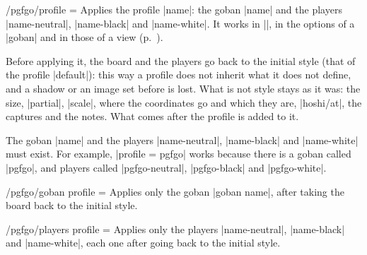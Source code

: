 \begin{goban}[9, stone = {radius = 4pt}, mark = {line = {color = red}}]
\begin{key}{/pgfgo/profile = }
	Applies the profile |name|: the goban |name| and the players |name-neutral|, |name-black| and |name-white|. It works in |\pgfgoset|, in the options of a |goban| and in those of a view (p.~\pageref{subsec:views}).

	Before applying it, the board and the players go back to the initial style (that of the profile |default|): this way a profile does not inherit what it does not define, and a shadow or an image set before is lost. What is not style stays as it was: the size, |partial|, |scale|, where the coordinates go and which they are, |hoshi/at|, the captures and the notes. What comes after the profile is added to it.

	\begin{codeexample}[width=3cm]
		\begin{goban}[3, profile = default]
		\end{goban}
	\end{codeexample}

	The goban |name| and the players |name-neutral|, |name-black| and |name-white| must exist. For example, |profile = pgfgo| works because there is a goban called |pgfgo|, and players called |pgfgo-neutral|, |pgfgo-black| and |pgfgo-white|.
\end{key}

\begin{key}{/pgfgo/goban profile = }
	Applies only the goban |goban name|, after taking the board back to the initial style.
\end{key}

\begin{key}{/pgfgo/players profile = }
	Applies only the players |name-neutral|, |name-black| and |name-white|, each one after going back to the initial style.

	\begin{codeexample}[]
		\begin{goban}[3, goban profile = pgfgo]
		\end{goban}

		\begin{goban}[3, players profile = pgfgo]
		\end{goban}
	\end{codeexample}
\end{key}


\end{goban}
